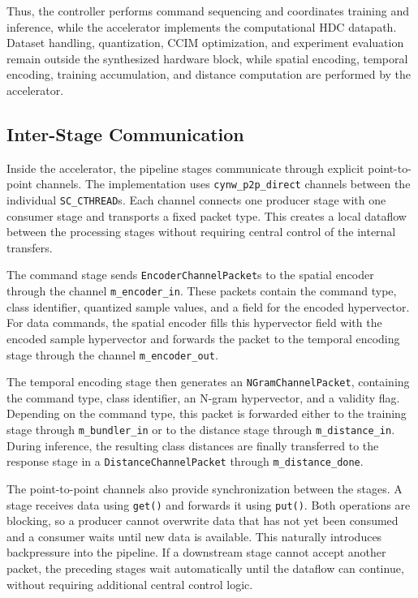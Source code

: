 Thus, the controller performs command sequencing and coordinates training and inference, while the accelerator implements the computational HDC datapath. Dataset handling, quantization, \ac{CCIM} optimization, and experiment evaluation remain outside the synthesized hardware block, while spatial encoding, temporal encoding, training accumulation, and distance computation are performed by the accelerator.




\subsection{Inter-Stage Communication}

Inside the accelerator, the pipeline stages communicate through explicit point-to-point channels. The implementation uses \texttt{cynw\_p2p\_direct} channels between the individual \texttt{SC\_CTHREAD}s. Each channel connects one producer stage with one consumer stage and transports a fixed packet type. 
This creates a local dataflow between the processing stages without requiring central control of the internal transfers.

The command stage sends \texttt{EncoderChannelPacket}s to the spatial encoder through the channel \texttt{m\_encoder\_in}. These packets contain the command type, class identifier, quantized sample values, and a field for the encoded hypervector. For data commands, the spatial encoder fills this hypervector field with the encoded sample hypervector and forwards the packet to the temporal encoding stage through the channel \texttt{m\_encoder\_out}.

The temporal encoding stage then generates an \texttt{NGramChannelPacket}, containing the command type, class identifier, an N-gram hypervector, and a validity flag. Depending on the command type, this packet is forwarded either to the training stage through \texttt{m\_bundler\_in} or to the distance stage through \texttt{m\_distance\_in}. During inference, the resulting class distances are finally transferred to the response stage in a \texttt{DistanceChannelPacket} through \texttt{m\_distance\_done}.

The point-to-point channels also provide synchronization between the stages. A stage receives data using \texttt{get()} and forwards it using \texttt{put()}. Both operations are blocking, so a producer cannot overwrite data that has not yet been consumed and a consumer waits until new data is available. This naturally introduces backpressure into the pipeline. If a downstream stage cannot accept another packet, the preceding stages wait automatically until the dataflow can continue, without requiring additional central control logic.

